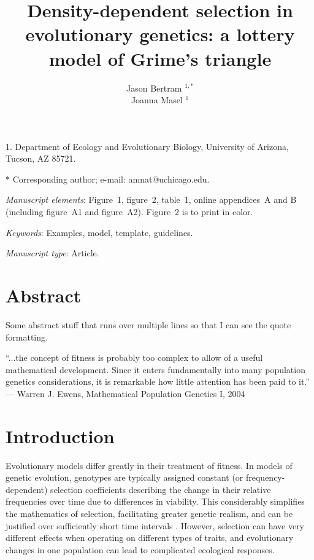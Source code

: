 \documentclass[11pt]{article}
\title{Density-dependent selection in evolutionary genetics: a lottery model of Grime's triangle}
\author{Jason Bertram $^{1,\ast}$ \\ 
Joanna Masel $^{1}$}
\date{}
\begin{document}
\maketitle

\noindent{}1. Department of Ecology and Evolutionary Biology, University of Arizona, Tucson, AZ 85721.

\noindent{}$\ast$ Corresponding author; e-mail: amnat@uchicago.edu.


\bigskip

\textit{Manuscript elements}: Figure~1, figure~2, table~1, online
appendices~A and B (including figure~A1 and figure~A2). Figure~2 is to
print in color.

\bigskip

\textit{Keywords}: Examples, model, template, guidelines.

\bigskip

\textit{Manuscript type}: Article. 

\bigskip


\linenumbers{}
\modulolinenumbers[3]

\newpage{}

\section*{Abstract}

Some abstract stuff that runs over multiple lines so that I can see the quote formatting.

\newpage{}

``...the concept of fitness is probably too complex to allow of a useful mathematical development. Since it enters fundamentally into many population genetics considerations, it is remarkable how little attention has been paid to it.'' --- Warren J. Ewens, Mathematical Population Genetics I, 2004 

\section*{Introduction}

Evolutionary models differ greatly in their treatment of fitness. In models of genetic evolution, genotypes are typically assigned constant (or frequency-dependent) selection coefficients describing the change in their relative frequencies over time due to differences in viability. This considerably simplifies the mathematics of selection, facilitating greater genetic realism, and can be justified over sufficiently short time intervals \citep[p. 276]{ewens_2012}. However, selection can have very different effects when operating on different types of traits, and evolutionary changes in one population can lead to complicated ecological responses.
\end{document}
